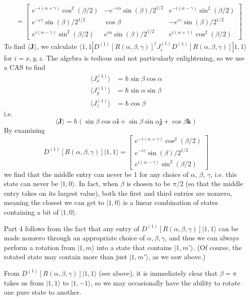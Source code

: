 \documentclass[../principles-of-quantum-mechanics.tex]{subfiles}
\begin{document}
\begin{questions}
\begin{solution}
\begin{align*}
				&= \begin{bmatrix}
					e^{-i(\alpha + \gamma)}\cos^2(\beta/2) & -e^{-i\alpha}\sin(\beta)/2^{1/2} & e^{-i(\alpha - \gamma)}\sin^2(\beta/2) \\
					e^{-i\gamma}\sin(\beta)/2^{1/2} & \cos\beta & -e^{i\gamma}\sin(\beta)/2^{1/2} \\
					e^{i(\alpha - \gamma)}\sin^2(\beta/2) & e^{i\alpha}\sin(\beta)/2^{1/2} & e^{i(\alpha + \gamma)}\cos^2(\beta/2)
				\end{bmatrix}
			\end{align*}
			To find $\langle \mathbf{J}\rangle$, we calculate $\langle 1, 1|D^{(1)}[R(\alpha, \beta, \gamma)]^\dagger J_i^{(1)}D^{(1)}[R(\alpha, \beta, \gamma)]|1, 1\rangle$ for $i = x, y, z$. The algebra is tedious and not particularly enlightening, so we use a CAS to find
			\begin{align*}
				\langle J_x^{(1)}\rangle &= \hbar\sin\beta\cos\alpha \\
				\langle J_y^{(1)}\rangle &= \hbar\sin\alpha\sin\beta \\
				\langle J_z^{(1)}\rangle &= \hbar\cos\beta
			\end{align*}
			i.e.
			$$\langle\mathbf{J}\rangle = \hbar(\sin\beta\cos\alpha\mathbf{i} + \sin\beta\sin\alpha\mathbf{j} + \cos\beta\mathbf{k})$$
			By examining
			$$D^{(1)}[R(\alpha, \beta, \gamma)]|1, 1\rangle = \begin{bmatrix}
			e^{-i(\alpha + \gamma)}\cos^2(\beta/2) \\
			e^{-i\gamma}\sin(\beta)/2^{1/2} \\
			e^{i(\alpha - \gamma)}\sin^2(\beta/2)
			\end{bmatrix}$$
			we find that the middle entry can never be $1$ for any choice of $\alpha$, $\beta$, $\gamma$, i.e. this state can never be $|1, 0\rangle$. In fact, when $\beta$ is chosen to be $\pi/2$ (so that the middle entry takes on its largest value), both the first and third entries are nonzero, meaning the closest we can get to $|1, 0\rangle$ is a linear combination of states containing a bit of $|1, 0\rangle$.
			
			Part 4 follows from the fact that any entry of $D^{(1)}[R(\alpha, \beta, \gamma)]|1, 1\rangle$ can be made nonzero through an appropriate choice of $\alpha, \beta, \gamma$, and thus we can always perform a rotation from $|1, m\rangle$ into a state that contains $|1, m'\rangle$. (Of course, the rotated state may contain more than just $|1, m'\rangle$, as we saw above.)
			
			From $D^{(1)}[R(\alpha, \beta, \gamma)]|1, 1\rangle$ (see above), it is immediately clear that $\beta = \pi$ takes us from $|1, 1\rangle$ to $|1, {-1}\rangle$, so we may occasionally have the ability to rotate one pure state to another.
		\end{solution}
	\end{questions}
\end{document}
